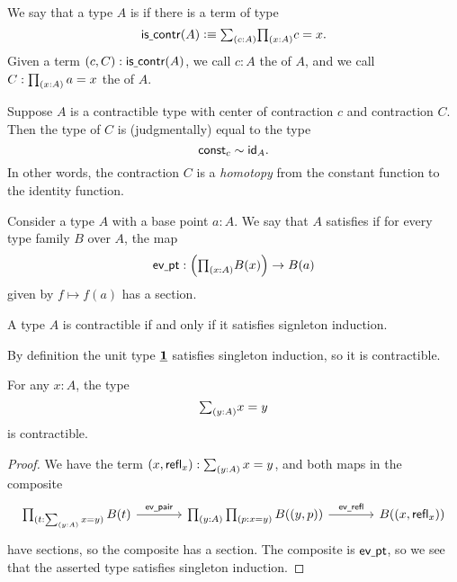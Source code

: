 \begin{defn}
We say that a type $A$ is  if there is a term of type
\begin{equation*}
\iscontr(A) \defeq \sm{c:A}\prd{x:A}c=x.
\end{equation*}
Given a term $(c,C):\iscontr(A)$, we call $c:A$ the  of $A$, and we call $C:\prd{x:A}a=x$ the  of $A$.
\end{defn}

Suppose $A$ is a contractible type with center of contraction $c$ and contraction $C$. Then the type of $C$ is (judgmentally) equal to the type
\begin{equation*}
\const_c\htpy\idfunc[A].
\end{equation*}
In other words, the contraction $C$ is a \emph{homotopy} from the constant function to the identity function.

\begin{defn}
Consider a type $A$ with a base point $a:A$. We say that $A$ satisfies  if for every type family $B$ over $A$, the map
\begin{equation*}
\evpt:\Big(\prd{x:A}B(x)\Big)\to B(a)
\end{equation*}
given by $f\mapsto f(a)$ has a section.
\end{defn}

\begin{prp}\label{thm:contractible}
A type $A$ is contractible if and only if it satisfies signleton induction.
\end{prp}

\begin{eg}
By definition the unit type $\unit$ satisfies singleton induction, so it is contractible.
\end{eg}

\begin{prp}\label{thm:total_path}
For any $x:A$, the type
\begin{equation*}
\sm{y:A}x=y
\end{equation*}
is contractible.
\end{prp}

\begin{proof}
We have the term $(x,\refl{x}):\sm{y:A}x=y$, and both maps in the composite
\begin{equation*}
\begin{tikzcd}[column sep=large]
\prd{t:\sm{y:A}x=y}B(t) \arrow[r,"\evpair"] & \prd{y:A}{p:x=y}B((y,p)) \arrow[r,"\evrefl"] & B((x,\refl{x}))
\end{tikzcd}
\end{equation*}
have sections, so the composite has a section. The composite is $\evpt$, so we see that the asserted type satisfies singleton induction.
\end{proof}

